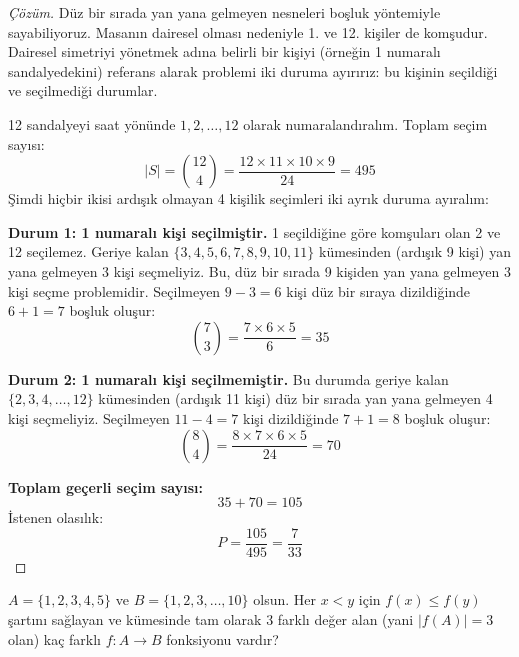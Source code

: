 \begin{proof}[Çözüm]
Düz bir sırada yan yana gelmeyen nesneleri boşluk yöntemiyle sayabiliyoruz. Masanın dairesel olması nedeniyle 1. ve 12. kişiler de komşudur. Dairesel simetriyi yönetmek adına belirli bir kişiyi (örneğin 1 numaralı sandalyedekini) referans alarak problemi iki duruma ayırırız: bu kişinin seçildiği ve seçilmediği durumlar.

12 sandalyeyi saat yönünde $1, 2, \dots, 12$ olarak numaralandıralım. Toplam seçim sayısı:
\[
|S| = \binom{12}{4} = \frac{12 \times 11 \times 10 \times 9}{24} = 495
\]
Şimdi hiçbir ikisi ardışık olmayan 4 kişilik seçimleri iki ayrık duruma ayıralım:

\textbf{Durum 1: 1 numaralı kişi seçilmiştir.}
1 seçildiğine göre komşuları olan 2 ve 12 seçilemez. Geriye kalan $\{3, 4, 5, 6, 7, 8, 9, 10, 11\}$ kümesinden (ardışık 9 kişi) yan yana gelmeyen 3 kişi seçmeliyiz.
Bu, düz bir sırada 9 kişiden yan yana gelmeyen 3 kişi seçme problemidir.
Seçilmeyen $9 - 3 = 6$ kişi düz bir sıraya dizildiğinde $6 + 1 = 7$ boşluk oluşur:
\[
\binom{7}{3} = \frac{7 \times 6 \times 5}{6} = 35
\]

\textbf{Durum 2: 1 numaralı kişi seçilmemiştir.}
Bu durumda geriye kalan $\{2, 3, 4, \dots, 12\}$ kümesinden (ardışık 11 kişi) düz bir sırada yan yana gelmeyen 4 kişi seçmeliyiz.
Seçilmeyen $11 - 4 = 7$ kişi dizildiğinde $7 + 1 = 8$ boşluk oluşur:
\[
\binom{8}{4} = \frac{8 \times 7 \times 6 \times 5}{24} = 70
\]

\textbf{Toplam geçerli seçim sayısı:}
\[
35 + 70 = 105
\]
İstenen olasılık:
\[
P = \frac{105}{495} = \frac{7}{33}
\]
\end{proof}

\begin{example}
$A = \{1, 2, 3, 4, 5\}$ ve $B = \{1, 2, 3, \dots, 10\}$ olsun. Her $x < y$ için $f(x) \le f(y)$ şartını sağlayan ve kümesinde tam olarak 3 farklı değer alan (yani $|f(A)| = 3$ olan) kaç farklı $f: A \to B$ fonksiyonu vardır?
\end{example}

